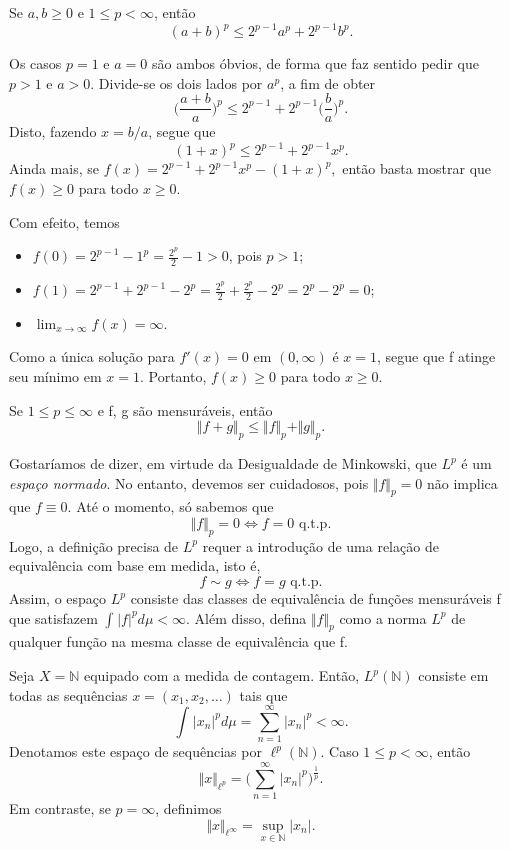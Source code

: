 \documentclass[measure_theory.tex]{subfiles}
\begin{document}
\begin{lemma*}
	Se \(a, b\geq 0\) e \(1\leq p < \infty\), então
	\[
		(a+b)^{p} \leq 2^{p-1}a^{p} + 2^{p-1}b^{p}.
	\]
\end{lemma*}
\begin{proof*}
	Os casos \(p=1\) e \(a=0\) são ambos óbvios, de forma que faz sentido pedir que \(p > 1\) e \(a > 0\). Divide-se os dois lados por \(a^{p}\), a fim de obter
	\[
		\biggl(\frac{a+b}{a}\biggr)^{p}\leq 2^{p-1} + 2^{p-1}\biggl(\frac{b}{a}\biggr)^{p}.
	\]
	Disto, fazendo \(x=b/a\), segue que
	\[
		(1+x)^{p}\leq 2^{p-1} + 2^{p-1}x^{p}.
	\]
	Ainda mais, se \(f(x) = 2^{p-1} + 2^{p-1}x^{p}-(1+x)^{p},\) então basta mostrar que \(f(x)\geq 0\) para todo \(x\geq 0\).

	Com efeito, temos
	\begin{itemize}
		\item \(f(0) = 2^{p-1}-1^{p} = \frac{2^{p}}{2}-1 > 0\), pois \(p>1\);
		\item \(f(1) = 2^{p-1} + 2^{p-1} - 2^{p} = \frac{2^{p}}{2} + \frac{2^{p}}{2} - 2^{p} = 2^{p}-2^{p} = 0\);
		\item \(\lim_{x\to \infty}f(x) = \infty\).
	\end{itemize}
	Como a única solução para \(f'(x) = 0\) em \((0, \infty)\) é \(x=1\), segue que f atinge seu mínimo em \(x=1\). Portanto, \(f(x)\geq 0\) para todo \(x\geq 0\).
\end{proof*}
\hypertarget{minkowski}{
	\begin{prop*}
		Se \(1\leq p\leq \infty\) e f, g são mensuráveis, então
		\[
			\Vert f + g \Vert_{p}\leq \Vert f \Vert_{p} + \Vert g \Vert_{p}.
		\]
	\end{prop*}
}
Gostaríamos de dizer, em virtude da Desigualdade de Minkowski, que \(L^{p}\) é um \textit{espaço normado}. No entanto, devemos ser cuidadosos, pois \(\Vert f \Vert_{p} = 0\) não implica que \(f\equiv 0\). Até o momento, só sabemos que
\[
	\Vert f \Vert_{p} = 0 \Longleftrightarrow f = 0 \text{ q.t.p.}
\]
Logo, a definição precisa de \(L^{p}\) requer a introdução de uma relação de equivalência com base em medida, isto é,
\[
	f\sim g \Longleftrightarrow f = g \text{ q.t.p.}
\]
Assim, o espaço \(L^{p}\) consiste das classes de equivalência de funções mensuráveis f que satisfazem \(\int_{}^{}|f|^{p}d\mu <\infty.\) Além disso, defina \(\Vert f \Vert_{p}\) como a norma \(L^{p}\) de qualquer função
na mesma classe de equivalência que f.
\begin{example}
	Seja \(X = \mathbb{N}\) equipado com a medida de contagem. Então, \(L^{p}(\mathbb{N})\) consiste em todas as sequências \(x=(x_1, x_2, \dotsc )\) tais que
	\[
		\int_{}^{}|x_{n}|^{p}d\mu = \sum\limits_{n=1}^{\infty}|x_{n}|^{p}<\infty.
	\]
	Denotamos este espaço de sequências por \(\ell ^{p}(\mathbb{N})\). Caso \(1\leq p < \infty\), então
	\[
		\Vert x \Vert_{\ell ^{p}} = \biggl(\sum\limits_{n=1}^{\infty}|x_{n}|^{p}\biggr)^{\frac{1}{p}}.
	\]
	Em contraste, se \(p = \infty\), definimos
	\[
		\Vert x \Vert_{\ell ^{\infty}} = \sup_{x\in \mathbb{N}}|x_{n}|.
	\]
\end{example}
\end{document}
